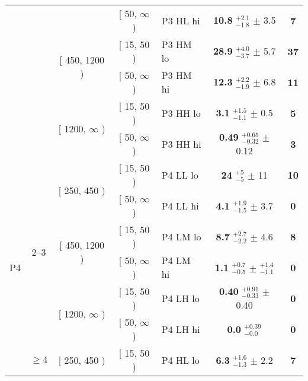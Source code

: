 \begin{table}[htbp]
\begin{tabular}{cccclcc}
& & & [ 50, $\infty$ ) & P3 HL hi & \textbf{10.8} $^{+2.1}_{-1.8}$ $\pm$ 3.5 & \textbf{7}\\ %

& & \multirow{2}{*}{[ 450, 1200 )} & [ 15, 50 ) & P3 HM lo & \textbf{28.9} $^{+4.0}_{-3.7}$ $\pm$ 5.7 & \textbf{37}\\ %

& & & [ 50, $\infty$ ) & P3 HM hi & \textbf{12.3} $^{+2.2}_{-1.9}$ $\pm$ 6.8 & \textbf{11}\\ %

& & \multirow{2}{*}{[ 1200, $\infty$ )} & [ 15, 50 ) & P3 HH lo & \textbf{3.1} $^{+1.5}_{-1.1}$ $\pm$ 0.5 & \textbf{5}\\ %

& & & [ 50, $\infty$ ) & P3 HH hi & \textbf{0.49} $^{+0.65}_{-0.32}$ $\pm$ 0.12 & \textbf{3}\\ %


\hline

\multirow{12}{*}{P4} 

& \multirow{6}{*}{2--3} & \multirow{2}{*}{[ 250, 450 )} & [ 15, 50 ) & P4 LL lo & \textbf{24} $^{+5}_{-5}$ $\pm$ 11 & \textbf{10}\\ %

& & & [ 50, $\infty$ ) & P4 LL hi & \textbf{4.1} $^{+1.9}_{-1.5}$ $\pm$ 3.7 & \textbf{0}\\ %

& & \multirow{2}{*}{[ 450, 1200 )} & [ 15, 50 ) & P4 LM lo & \textbf{8.7} $^{+2.7}_{-2.2}$ $\pm$ 4.6 & \textbf{8}\\ %

& & & [ 50, $\infty$ ) & P4 LM hi & \textbf{1.1} $^{+0.7}_{-0.5}$ $\pm$ $^{+1.4}_{-1.1}$  & \textbf{0}\\ %

& & \multirow{2}{*}{[ 1200, $\infty$ )} & [ 15, 50 ) & P4 LH lo & \textbf{0.40} $^{+0.91}_{-0.33}$ $\pm$ 0.40  & \textbf{0}\\ %

& & & [ 50, $\infty$ ) & P4 LH hi & \textbf{0.0} $^{+0.39}_{-0.0}$  & \textbf{0}\\ %

%

& \multirow{6}{*}{$\geq 4$} & \multirow{2}{*}{[ 250, 450 )} & [ 15, 50 ) & P4 HL lo & \textbf{6.3} $^{+1.6}_{-1.3}$ $\pm$ 2.2  & \textbf{7}\\ %


\end{tabular}
\end{table}
